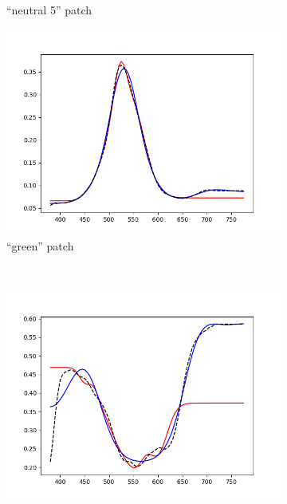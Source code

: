 \begin{figure}[t]
\begin{subfigure}[t]{0.45\textwidth}
		\caption{``neutral 5'' patch}
		\label{fig:resultsTechnique_neutral5}
	\end{subfigure} \hspace{0.1em}
	\begin{subfigure}[t]{0.45\textwidth}
		\includegraphics[width=\linewidth]{img/results_techniqueGreen.png}
		\caption{``green'' patch}
		\label{fig:resultsTechnique_green}
	\end{subfigure} \hspace{0.1em}
	\vspace{0.5em}\\
	\begin{subfigure}[t]{0.45\textwidth}
		\includegraphics[width=\linewidth]{img/results_techniqueBlueFlower.png}

\end{subfigure}
\end{figure}
